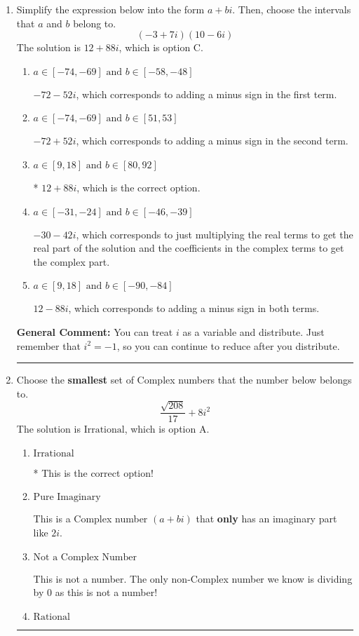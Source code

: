 \documentclass{extbook}[14pt]
\newcommand{\litem}[1]{\item #1

\rule{\textwidth}{0.4pt}}
\begin{document}
\begin{enumerate}\litem{
Simplify the expression below into the form $a+bi$. Then, choose the intervals that $a$ and $b$ belong to.
\[ (-3 + 7 i)(10 - 6 i) \]
The solution is \( 12 + 88 i \), which is option C.\begin{enumerate}[label=\Alph*.]
\item \( a \in [-74, -69] \text{ and } b \in [-58, -48] \)

 $-72 - 52 i$, which corresponds to adding a minus sign in the first term.
\item \( a \in [-74, -69] \text{ and } b \in [51, 53] \)

 $-72 + 52 i$, which corresponds to adding a minus sign in the second term.
\item \( a \in [9, 18] \text{ and } b \in [80, 92] \)

* $12 + 88 i$, which is the correct option.
\item \( a \in [-31, -24] \text{ and } b \in [-46, -39] \)

 $-30 - 42 i$, which corresponds to just multiplying the real terms to get the real part of the solution and the coefficients in the complex terms to get the complex part.
\item \( a \in [9, 18] \text{ and } b \in [-90, -84] \)

 $12 - 88 i$, which corresponds to adding a minus sign in both terms.
\end{enumerate}

\textbf{General Comment:} You can treat $i$ as a variable and distribute. Just remember that $i^2=-1$, so you can continue to reduce after you distribute.
}
\litem{
Choose the \textbf{smallest} set of Complex numbers that the number below belongs to.
\[ \frac{\sqrt{208}}{17}+8i^2 \]
The solution is \( \text{Irrational} \), which is option A.\begin{enumerate}[label=\Alph*.]
\item \( \text{Irrational} \)

* This is the correct option!
\item \( \text{Pure Imaginary} \)

This is a Complex number $(a+bi)$ that \textbf{only} has an imaginary part like $2i$.
\item \( \text{Not a Complex Number} \)

This is not a number. The only non-Complex number we know is dividing by 0 as this is not a number!
\item \( \text{Rational} \)


\end{enumerate}}
\end{enumerate}
\end{document}
